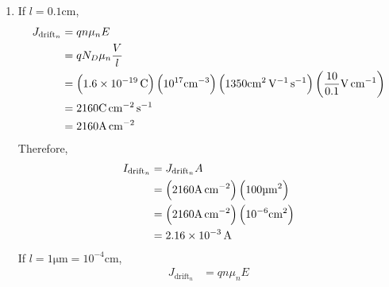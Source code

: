 \documentclass[fleqn, a4paper, 11pt, oneside]{amsart}
\theoremstyle{definition}
\theoremstyle{theorem}
\begin{document}
\begin{solution}
	\begin{enumerate}[leftmargin=*]
		\item
			If $l = 0.1 \si{\centi\metre}$,
			\begin{align*}
				J_{\text{drift}_n} & = q n \mu_n E                                                                                                                                                                                                               \\
                                                   & = q N_D \mu_n \frac{V}{l}                                                                                                                                                                                                   \\
                                                   & = \left( 1.6 \times 10^{-19} \coulomb \right) \left( 10^{17} \si{\per\centi\metre\cubed} \right) \left( 1350 \si{\centi\metre\squared\per\volt\per\second} \right) \left( \frac{10}{0.1} \si{\volt\per\centi\metre} \right) \\
                                                   & = 2160 \si{\coulomb\per\centi\metre\squared\per\second}                                                                                                                                                                     \\
                                                   & = 2160 \si{\ampere\per\centi\metre\squared}
			\end{align*}
			Therefore,
			\begin{align*}
				I_{\text{drift}_n} & = J_{\text{drift}_n} A                                                                                      \\
                                                   & = \left( 2160 \si{\ampere\per\centi\metre\squared} \right) \left( 100 \si{\micro\metre\squared} \right)     \\
                                                   & = \left( 2160 \si{\ampere\per\centi\metre\squared} \right) \left( 10^{-6} \si{\centi\metre\squared} \right) \\
                                                   & = 2.16 \times 10^{-3} \ampere
			\end{align*}
			If $l = 1 \si{\micro\metre} = 10^{-4} \si{\centi\metre}$,
			\begin{align*}
				J_{\text{drift}_n} & = q n \mu_n E                                                                                                                                                                                                                          \\

\end{align*}
\end{enumerate}
\end{solution}
\end{document}
